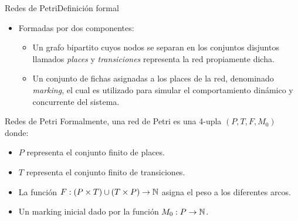 \documentclass[spanish,pdf]{beamer}
\begin{document}
\begin{frame}{Redes de Petri}{Definición formal}
  \begin{itemize}
    \item<2-> Formadas por dos componentes:
      \begin{itemize}
        \setlength\itemsep{0.2cm}
          \item<3-> Un grafo bipartito cuyos nodos se separan en los conjuntos disjuntos llamados
                    \textit{places} y \textit{transiciones} representa la red propiamente dicha.
          \item<4-> Un conjunto de fichas asignadas a los places de la red, denominado \textit{marking},
                    el cual es utilizado para simular el comportamiento dinámico y concurrente del sistema.
      \end{itemize}
  \end{itemize}

  \pause[5]

  \begin{block}{Redes de Petri}
    Formalmente, una red de Petri es una 4-upla $(P,T,F,M_0)$ donde:
     \begin{itemize}
        \item<6->{$P$ representa el conjunto finito de places.}
        \item<7->{$T$ representa el conjunto finito de transiciones.}
        \item<8->{La función \mbox{$F:(P \times T) \cup (T \times P)  \to \nat$} asigna el peso a los diferentes arcos.}
        \item<9->{Un marking inicial dado por la función \mbox{$M_0:P \to \nat$}.}
     \end{itemize}
  \end{block}
\end{frame}
\end{document}
